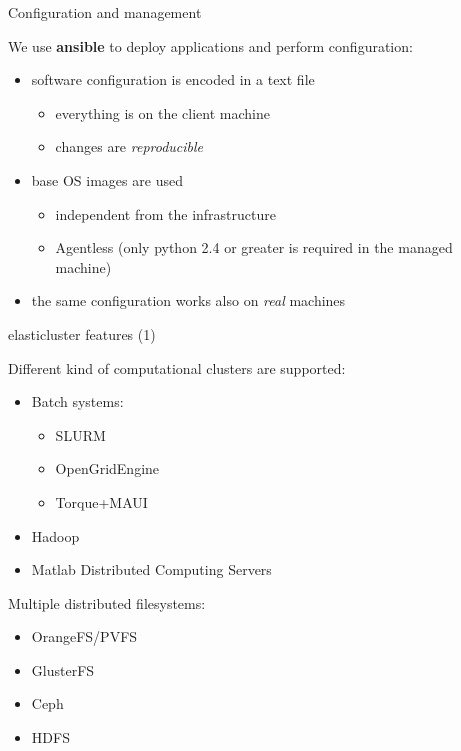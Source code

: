 \documentclass[english,serif,mathserif,usenames,dvipsnames]{beamer}
\begin{document}
\begin{frame}
  {Configuration and management}

  We use \textbf{ansible} to deploy applications and perform
  configuration:
  \begin{itemize}
  \item software configuration is encoded in a text file
    \begin{itemize}
    \item everything is on the client machine
    \item changes are \textit{reproducible} 
    \end{itemize}
  \item base OS images are used
    \begin{itemize}
    \item independent from the infrastructure
    \item Agentless (only python 2.4 or greater is required in the
    managed machine)
    \end{itemize}
  \item the same configuration works also on \textit{real} machines
  \end{itemize}

\end{frame}

\begin{frame}
  {elasticluster features (1)}

  Different kind of computational clusters are supported:

  \begin{itemize}
    \item Batch systems:
      \begin{itemize}
      \item SLURM
      \item OpenGridEngine
      \item Torque+MAUI
      \end{itemize}
    \item Hadoop
    \item Matlab Distributed Computing Servers
    \end{itemize}

  \+
  \pause
  Multiple distributed filesystems:

  \begin{itemize}
  \item OrangeFS/PVFS
  \item GlusterFS
  \item Ceph
  \item HDFS
  \end{itemize}
\end{frame}
\end{document}
